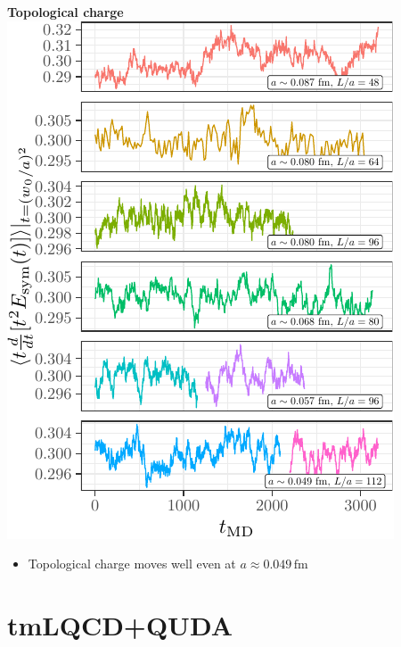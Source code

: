 \documentclass[a0,portrait]{a0poster}
\begin{document}
\begin{multicols}{2}
    \hfill
    \begin{minipage}{0.48\linewidth}
        \centering
        \textbf{\hspace{3cm}Topological charge}\\
        \includegraphics[width=\linewidth,page=2]{data/gf_observables/gf_observables_md_histories}
        \begin{itemize}
            \item Topological charge moves well even at $a\approx 0.049 \, \mathrm{fm}$
        \end{itemize}
    \end{minipage}



    \section{tmLQCD+QUDA}


\end{multicols}
\end{document}
